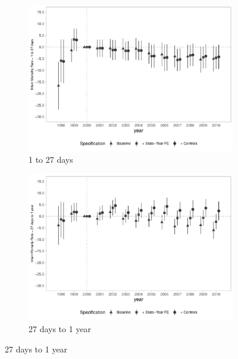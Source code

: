 \begin{figure}[h]
\begin{center}
    \begin{subfigure}{0.48\textwidth}
        \centering
        \caption{\scriptsize 1 to 27 days}\label{fig:imr2_c}
        \includegraphics[width=\textwidth]{plots/IMR/tx_mi_27d_dist_ec29_baseline_dist_ec29_baseline_full.pdf}
    \end{subfigure}
    \begin{subfigure}{0.48\textwidth}
        \centering
        \caption{\scriptsize 27 days to 1 year}\label{fig:imr2_d}
        \includegraphics[width=\textwidth]{plots/IMR/tx_mi_ano_dist_ec29_baseline_dist_ec29_baseline_full.pdf}
    \end{subfigure}
    
    \end{center}
    
\end{figure}


